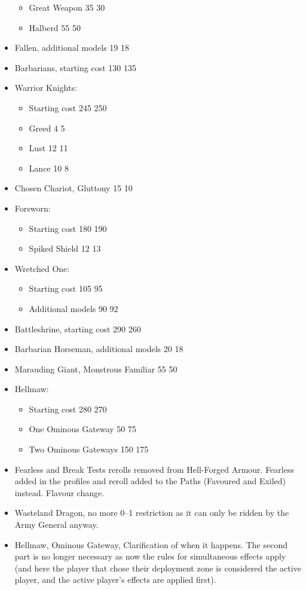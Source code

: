 \begin{itemize}
\begin{itemize}
\item Great Weapon 35 \costdown{} 30
\item Halberd 55 \costdown{} 50
\end{itemize}
\item Fallen, additional models 19 \costdown{} 18
\item Barbarians, starting cost 130 \costup{} 135
\item Warrior Knights:
\begin{itemize}
\item Starting cost 245 \costup{} 250
\item Greed 4 \costup{} 5
\item Lust 12 \costdown{} 11
\item Lance 10 \costdown{} 8
\end{itemize}
\item Chosen Chariot, Gluttony 15 \costdown{} 10
\item Forsworn:
\begin{itemize}
\item Starting cost 180 \costup{} 190
\item Spiked Shield 12 \costup{} 13
\end{itemize}
\item Wretched One:
\begin{itemize}
\item Starting cost 105 \costdown{} 95
\item Additional models 90 \costup{} 92
\end{itemize}
\item Battleshrine, starting cost 290 \costdown{} 260
\item Barbarian Horseman, additional models 20 \costdown{} 18
\item Marauding Giant, Monstrous Familiar 55 \costdown{} 50
\item Hellmaw:
\begin{itemize}
\item Starting cost 280 \costdown{} 270
\item One Ominous Gateway 50 \costup{} 75
\item Two Ominous Gateways 150 \costup{} 175
\end{itemize}
\end{itemize}

\subtitle{Clarification and rewording}

\begin{itemize}
\item Fearless and Break Tests rerolls removed from Hell-Forged Armour. Fearless added in the profiles and reroll added to the Paths (Favoured and Exiled) instead. Flavour change.
\item Wasteland Dragon, no more 0--1 restriction as it can only be ridden by the Army General anyway.
\item Hellmaw, Ominous Gateway, Clarification of when it happens. The second part is no longer necessary as now the rules for simultaneous effects apply (and here the player that chose their deployment zone is considered the active player, and the active player's effects are applied first).
\end{itemize}
